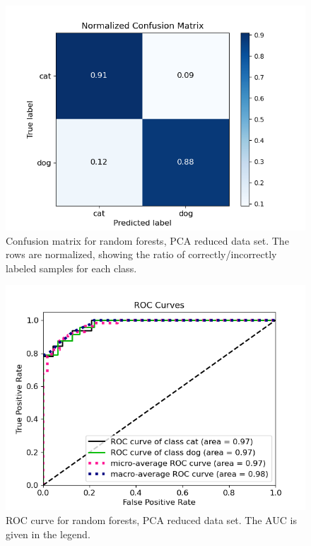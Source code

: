 \documentclass[a4paper]{article}
\begin{document}
\begin{figure}[H]
	\centering
	\includegraphics[scale=0.6]{../figures/random_forest/confusion_matrix_nbins200_pca35_seed4155_ts0.20.png}
	\caption{Confusion matrix for random forests, PCA reduced data set. The rows are normalized, showing the ratio of correctly/incorrectly labeled samples for each class.}
	\label{fig:rf_confusion_pca}
\end{figure}	

\begin{figure}[H]
	\centering
	\includegraphics[scale=0.5]{../figures/random_forest/roc_nbins200_pca35_seed4155_ts0.20.png}
	\caption{ROC curve for random forests, PCA reduced data set. The AUC is given in the legend.}
	\label{fig:rf_roc_pca}
\end{figure}	
\end{document}
